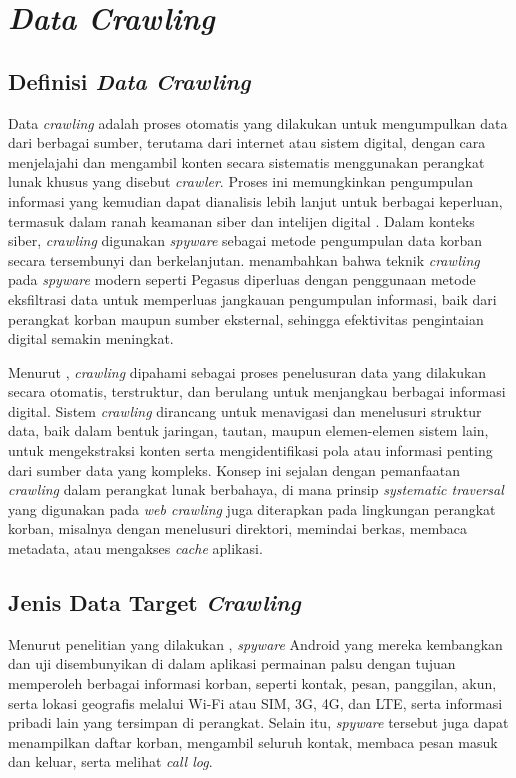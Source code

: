 \section{\textit{Data Crawling}}
\subsection{Definisi \textit{Data Crawling}}

Data \textit{crawling} adalah proses otomatis yang dilakukan untuk 
mengumpulkan data dari berbagai sumber, terutama dari internet atau sistem 
digital, dengan cara menjelajahi dan mengambil konten secara sistematis 
menggunakan perangkat lunak khusus yang disebut \textit{crawler}. Proses 
ini memungkinkan pengumpulan informasi yang kemudian dapat dianalisis lebih 
lanjut untuk berbagai keperluan, termasuk dalam ranah keamanan siber dan 
intelijen digital \autocite{salih2020spyware}. Dalam konteks siber, 
\textit{crawling} digunakan \textit{spyware} sebagai metode pengumpulan 
data korban secara tersembunyi dan berkelanjutan. \textcite{kareem2024pegasus} menambahkan bahwa teknik \textit{crawling} pada 
\textit{spyware} modern seperti Pegasus diperluas dengan penggunaan metode 
eksfiltrasi data untuk memperluas jangkauan pengumpulan informasi, baik 
dari perangkat korban maupun sumber eksternal, sehingga efektivitas 
pengintaian digital semakin meningkat.

Menurut \textcite{jegan2024aicrawler}, \textit{crawling} dipahami sebagai proses 
penelusuran data yang dilakukan secara otomatis, terstruktur, dan berulang 
untuk menjangkau berbagai informasi digital. Sistem \textit{crawling} 
dirancang untuk menavigasi dan menelusuri struktur data, baik dalam bentuk 
jaringan, tautan, maupun elemen-elemen sistem lain, untuk mengekstraksi 
konten serta mengidentifikasi pola atau informasi penting dari sumber data 
yang kompleks. Konsep ini sejalan dengan pemanfaatan \textit{crawling} 
dalam perangkat lunak berbahaya, di mana prinsip \textit{systematic 
traversal} yang digunakan pada \textit{web crawling} juga diterapkan pada 
lingkungan perangkat korban, misalnya dengan menelusuri direktori, memindai 
berkas, membaca metadata, atau mengakses \textit{cache} aplikasi.

\subsection{Jenis Data Target \textit{Crawling}}
Menurut penelitian yang dilakukan \textcite{salih2020spyware}, 
\textit{spyware} Android yang mereka kembangkan dan uji disembunyikan 
di dalam aplikasi permainan palsu dengan tujuan memperoleh berbagai 
informasi korban, seperti kontak, pesan, panggilan, akun, serta lokasi 
geografis melalui Wi-Fi atau SIM, 3G, 4G, dan LTE, serta informasi pribadi 
lain yang tersimpan di perangkat. Selain itu, \textit{spyware} tersebut 
juga dapat menampilkan daftar korban, mengambil seluruh kontak, membaca 
pesan masuk dan keluar, serta melihat \textit{call log}.

